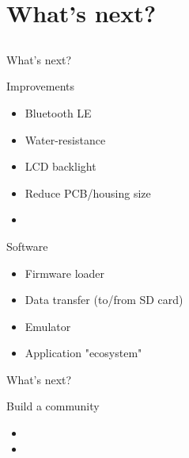 \documentclass[compress,red]{beamer}
\begin{document}
\section{What's next?}

\subsection*{} %

\begin{frame}{What's next?}

  \begin{block}{Improvements}
    \begin{itemize}
    \item Bluetooth LE
    \item Water-resistance
    \item LCD backlight
    \item Reduce PCB/housing size
    \item 
    \end{itemize}
  \end{block}

  \begin{block}{Software}
    \begin{itemize}
    \item Firmware loader
    \item Data transfer (to/from SD card)
    \item Emulator
    \item Application "ecosystem"
    \end{itemize}
  \end{block}

  \note[item]{}

\end{frame}

\begin{frame}{What's next?}

  \begin{block}{Build a community}
    \begin{itemize}
    \item 
    \item 
    \end{itemize}
  \end{block}

  \note[item]{}

\end{frame}
\end{document}
